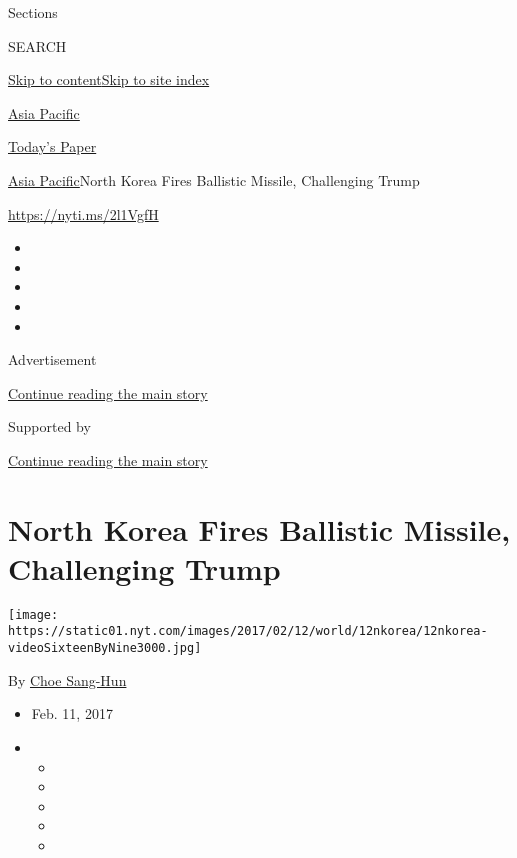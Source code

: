 Sections

SEARCH

\protect\hyperlink{site-content}{Skip to
content}\protect\hyperlink{site-index}{Skip to site index}

\href{https://www.nytimes.com/section/world/asia}{Asia Pacific}

\href{https://myaccount.nytimes.com/auth/login?response_type=cookie\&client_id=vi}{}

\href{https://www.nytimes.com/section/todayspaper}{Today's Paper}

\href{/section/world/asia}{Asia Pacific}\textbar{}North Korea Fires
Ballistic Missile, Challenging Trump

\url{https://nyti.ms/2l1VgfH}

\begin{itemize}
\item
\item
\item
\item
\item
\end{itemize}

Advertisement

\protect\hyperlink{after-top}{Continue reading the main story}

Supported by

\protect\hyperlink{after-sponsor}{Continue reading the main story}

\hypertarget{north-korea-fires-ballistic-missile-challenging-trump}{%
\section{North Korea Fires Ballistic Missile, Challenging
Trump}\label{north-korea-fires-ballistic-missile-challenging-trump}}

\texttt{[image: https://static01.nyt.com/images/2017/02/12/world/12nkorea/12nkorea-videoSixteenByNine3000.jpg]}

By \href{http://www.nytimes.com/by/choe-sang-hun}{Choe Sang-Hun}

\begin{itemize}
\item
  Feb. 11, 2017
\item
  \begin{itemize}
  \item
  \item
  \item
  \item
  \item
  \end{itemize}
\end{itemize}

